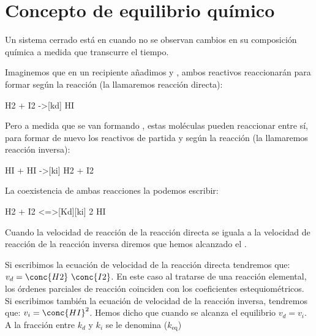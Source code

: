 
    \section{Concepto de equilibrio químico}\label{sec:concepto-de-equilibrio-quimico}

    \setcounter{ejemplo}{0}

    \begin{center}
        \begin{definition}
            Un sistema cerrado está en  cuando no se observan cambios en su composición química a medida que transcurre el tiempo.
        \end{definition}
    \end{center}

    Imaginemos que en un recipiente añadimos  y , ambos reactivos reaccionarán para formar  según la reacción (la llamaremos reacción directa):

    \begin{reaction}[Formación de HI]
        H2\gas{} + I2\gas{} ->[kd] HI\gas{} \label{rxn:formacionHI}
    \end{reaction}

    Pero a medida que se van formando , estas moléculas pueden reaccionar entre sí, para formar de nuevo los reactivos de partida  y  según la reacción (la llamaremos reacción inversa):
    \begin{reaction}[Descomposición de HI]
        HI\gas{} + HI\gas{} ->[ki] H2\gas{} + I2\gas{} \label{rxn:descomposicionHI}
    \end{reaction}

    La coexistencia de ambas reacciones la podemos escribir:

    \begin{reaction}[Equilibrio HI]
        H2\gas{} + I2\gas{} <=>[Kd][ki] 2 HI\gas{} \label{rxn:equilibrioHI}
    \end{reaction}

    Cuando la velocidad de reacción de la reacción directa se iguala a la velocidad de reacción de la reacción inversa diremos que hemos alcanzado el .

    Si escribimos la ecuación de velocidad de la reacción directa tendremos que: $v_d = \conc{H2}\ \conc{I2}$.
    En este caso al tratarse de una reacción elemental, los órdenes parciales de reacción coinciden con los coeficientes estequiométricos.
    Si escribimos también la ecuación de velocidad de la reacción inversa, tendremos que: $v_i = \conc{HI}^2$.
    Hemos dicho que cuando se alcanza el equilibrio $v_d = v_i$.
    A la fracción entre $k_d$ y $k_i$ se le denomina  ($k_{\text{eq}}$)

